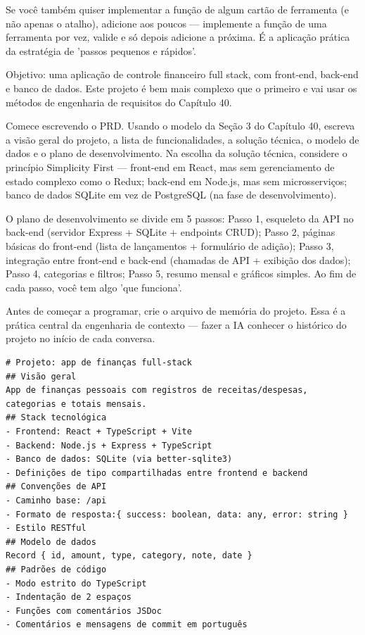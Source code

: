 Se você também quiser implementar a função de algum cartão de ferramenta (e não apenas o atalho), adicione aos poucos — implemente a função de uma ferramenta por vez, valide e só depois adicione a próxima. É a aplicação prática da estratégia de 'passos pequenos e rápidos'.



Objetivo: uma aplicação de controle financeiro full stack, com front-end, back-end e banco de dados. Este projeto é bem mais complexo que o primeiro e vai usar os métodos de engenharia de requisitos do Capítulo 40.

Comece escrevendo o PRD. Usando o modelo da Seção 3 do Capítulo 40, escreva a visão geral do projeto, a lista de funcionalidades, a solução técnica, o modelo de dados e o plano de desenvolvimento. Na escolha da solução técnica, considere o princípio Simplicity First — front-end em React, mas sem gerenciamento de estado complexo como o Redux; back-end em Node.js, mas sem microsserviços; banco de dados SQLite em vez de PostgreSQL (na fase de desenvolvimento).

O plano de desenvolvimento se divide em 5 passos: Passo 1, esqueleto da API no back-end (servidor Express + SQLite + endpoints CRUD); Passo 2, páginas básicas do front-end (lista de lançamentos + formulário de adição); Passo 3, integração entre front-end e back-end (chamadas de API + exibição dos dados); Passo 4, categorias e filtros; Passo 5, resumo mensal e gráficos simples. Ao fim de cada passo, você tem algo 'que funciona'.


Antes de começar a programar, crie o arquivo de memória do projeto. Essa é a prática central da engenharia de contexto — fazer a IA conhecer o histórico do projeto no início de cada conversa.

\begin{lstlisting}
# Projeto: app de finanças full-stack
## Visão geral
App de finanças pessoais com registros de receitas/despesas, categorias e totais mensais.
## Stack tecnológica
- Frontend: React + TypeScript + Vite
- Backend: Node.js + Express + TypeScript
- Banco de dados: SQLite (via better-sqlite3)
- Definições de tipo compartilhadas entre frontend e backend
## Convenções de API
- Caminho base: /api
- Formato de resposta:{ success: boolean, data: any, error: string }
- Estilo RESTful
## Modelo de dados
Record { id, amount, type, category, note, date }
## Padrões de código
- Modo estrito do TypeScript
- Indentação de 2 espaços
- Funções com comentários JSDoc
- Comentários e mensagens de commit em português
\end{lstlisting}

